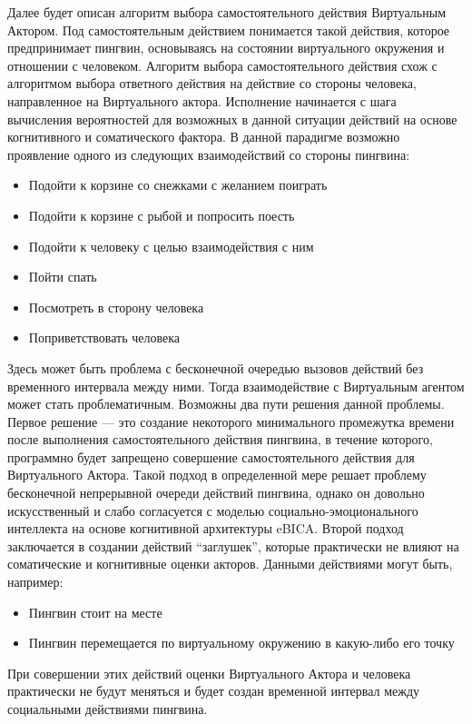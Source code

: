 Далее будет описан алгоритм выбора самостоятельного действия Виртуальным Актором. Под самостоятельным действием понимается такой действия, которое предпринимает пингвин, основываясь на состоянии виртуального окружения и отношении с человеком. Алгоритм выбора самостоятельного действия схож с алгоритмом выбора ответного действия на действие со стороны человека, направленное на Виртуального актора. Исполнение начинается с шага вычисления вероятностей для возможных в данной ситуации действий на основе когнитивного и соматического фактора. В данной парадигме возможно проявление одного из следующих взаимодействий со стороны пингвина:
\begin{itemize}
  \item Подойти к корзине со снежками с желанием поиграть
  \item Подойти к корзине с рыбой и попросить поесть
  \item Подойти к человеку с целью взаимодействия с ним
  \item Пойти спать
  \item Посмотреть в сторону человека
  \item Поприветствовать человека
\end{itemize}
  
Здесь может быть проблема с бесконечной очередью вызовов действий без временного интервала между ними. Тогда взаимодействие с Виртуальным агентом может стать проблематичным. Возможны два пути решения данной проблемы. Первое решение — это создание некоторого минимального промежутка времени после выполнения самостоятельного действия пингвина, в течение которого, программно будет запрещено совершение самостоятельного действия для Виртуального Актора. Такой подход в определенной мере решает проблему бесконечной непрерывной очереди действий пингвина, однако он довольно искусственный и слабо согласуется с моделью социально-эмоционального интеллекта на основе когнитивной архитектуры eBICA. Второй подход заключается в создании действий “заглушек”, которые практически не влияют на соматические и когнитивные оценки акторов. Данными действиями могут быть, например:
\begin{itemize}
\item Пингвин стоит на месте
\item Пингвин перемещается по виртуальному окружению в какую-либо его точку
\end{itemize}

При совершении этих действий оценки Виртуального Актора и человека практически не будут меняться и будет создан временной интервал между социальными действиями пингвина. 

